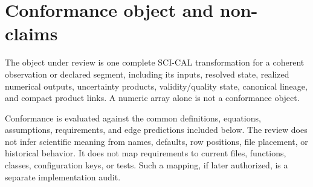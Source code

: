 \documentclass[10pt]{article}
\begin{document}

\AuthorityNotice

\begin{abstract}
This document converts the shared SCI-CAL v0.1 scientific authority, as
explained by Science-Team Rationale r0.5, into
observable conformance conditions. A candidate realizes a typed, occurrence-
scoped transformation from admitted  samples to top-of-atmosphere
point-source-peak \(\mjybeam\), applies selected  and target
atmosphere correction exactly once, preserves the boundary to downstream
measurement-noise estimation, maintains a complete systematic ledger, and emits
resolvable lineage and truthful validity/quality state. This view does not
prescribe present software structure and does not assert that any
implementation conforms. The common numbered requirements are the only
normative clauses; the procedures here describe evidence for them. Q01--Q09
are scientifically dispositioned; explicitly unavailable uncertainty products
and achieved-performance acceptance remain visible and cannot be fabricated by
candidate metadata or implementation behavior.
\end{abstract}

\tableofcontents
\clearpage

\section{Conformance object and non-claims}
\label{sec:eng-purpose}

The object under review is one complete SCI-CAL transformation for a coherent
observation or declared segment, including its inputs, resolved state,
realized numerical outputs, uncertainty products, validity/quality state,
canonical lineage, and compact product links. A numeric array alone is not a
conformance object.

Conformance is evaluated against the common definitions, equations,
assumptions, requirements, and edge predictions included below. The review
does not infer scientific meaning from names, defaults, row positions, file
placement, or historical behavior. It does not map requirements to current
files, functions, classes, configuration keys, or tests. Such a mapping, if
later authorized, is a separate implementation audit.
\end{document}
